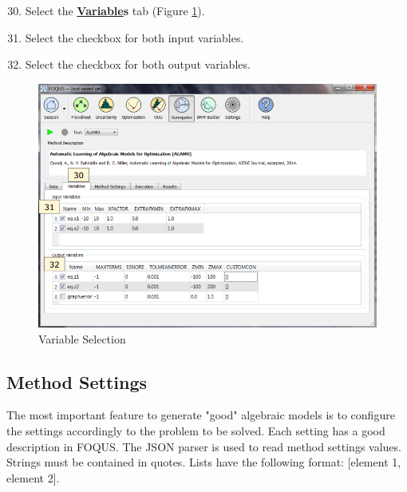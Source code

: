 \begin{enumerate}
	\setcounter{enumi}{29}
	\item Select the \textbf{\underline{Variable}s} tab (Figure \ref{fig.tut.sur.vaiables}).
	\item Select the checkbox for both input variables.
	\item Select the checkbox for both output variables.
\end{enumerate}
\begin{figure}[H]
	\begin{center}
		\includegraphics[scale=0.55]{Chapt_surrogates/figs/variables}
		\caption{Variable Selection}
		\label{fig.tut.sur.vaiables}
	\end{center}
\end{figure}

\subsection{Method Settings}
\label{tutorial.alamo.methodsettings}
The most important feature to generate "good" algebraic models is to configure the settings accordingly to the problem to be solved.  Each setting has a good description in FOQUS. The JSON parser is used to read method settings values. Strings must be contained in quotes. Lists have the following format: [element 1, element 2].

